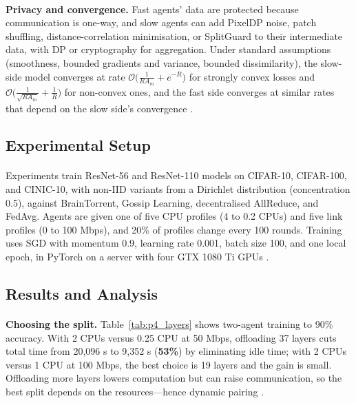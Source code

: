 \documentclass[12pt,a4paper,final]{extreport}
\begin{document}
\paragraph{} \textbf{Privacy and convergence.} Fast agents' data are protected because communication is one-way, and slow agents can add PixelDP noise, patch shuffling, distance-correlation minimisation, or SplitGuard to their intermediate data, with DP or cryptography for aggregation. Under standard assumptions (smoothness, bounded gradients and variance, bounded dissimilarity), the slow-side model converges at rate $\mathcal{O}\big(\tfrac{1}{RA_m}+e^{-R}\big)$ for strongly convex losses and $\mathcal{O}\big(\tfrac{1}{\sqrt{RA_m}}+\tfrac{1}{R}\big)$ for non-convex ones, and the fast side converges at similar rates that depend on the slow side's convergence \cite{p4}.

\subsection{Experimental Setup}

\paragraph{} Experiments train ResNet-56 and ResNet-110 models on CIFAR-10, CIFAR-100, and CINIC-10, with non-IID variants from a Dirichlet distribution (concentration 0.5), against BrainTorrent, Gossip Learning, decentralised AllReduce, and FedAvg. Agents are given one of five CPU profiles (4 to 0.2 CPUs) and five link profiles (0 to 100 Mbps), and 20\% of profiles change every 100 rounds. Training uses SGD with momentum 0.9, learning rate 0.001, batch size 100, and one local epoch, in PyTorch on a server with four GTX 1080 Ti GPUs \cite{p4}.

\subsection{Results and Analysis}

\paragraph{} \textbf{Choosing the split.} Table~\ref{tab:p4_layers} shows two-agent training to 90\% accuracy. With 2 CPUs versus 0.25 CPU at 50 Mbps, offloading 37 layers cuts total time from 20{,}096 s to 9{,}352 s (\textbf{53\%}) by eliminating idle time; with 2 CPUs versus 1 CPU at 100 Mbps, the best choice is 19 layers and the gain is small. Offloading more layers lowers computation but can raise communication, so the best split depends on the resources---hence dynamic pairing \cite{p4}.
\end{document}
